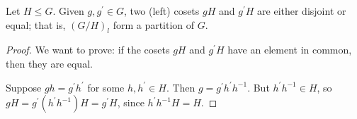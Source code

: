 \begin{comment}
\begin{mdframed}
The following is an alternative formation using quotient sets.

Let $H\le G$. Define $\sim$ on $G$ as follows: for all $x,y\in G$,
\[x\sim y\iff x^{-1}y\in H.\]
We verify that this is an equivalence relation:
\begin{enumerate}[label=(\roman*)]
\item $\forall x\in G$,
\[x^{-1}x=e\in H\implies x\sim x\]
\item $\forall x,y\in G$,
\begin{align*}
x\sim y
&\implies x^{-1}y\in H\\
&\implies (x^{-1}y)^{-1}\in H\\
&\implies y^{-1}x\in H\\
&\implies y\sim x
\end{align*}
\item $\forall a,b,c\in G$,
\begin{align*}
a\sim b,b\sim c
&\implies a^{-1}b\in H, b^{-1}c\in H\\
&\implies (a^{-1}b)(b^{-1}c)=a^{-1}c\in H\\
&\implies a\sim c
\end{align*}
\end{enumerate}
Denote the set of equivalence classes as
\[G/\sim\coloneqq\{[x]\mid x\in G\}.\]
Given $x,y\in G$, we formulate a left coset of $H$ in $G$ as follows:
\begin{align*}
x\sim y
&\iff x^{-1}y\in H\\
&\iff \exists h\in H,x^{-1}y=h\\
&\iff \exists h\in H,y=xh\iff y\in xH
\end{align*}
and hence $[x]=xH$. Thus we can write
\[G/\sim=(G/H)_{l}.\]
As for the right coset, define
\[x\sim y\iff xy^{-1}\in H\]
and the rest is similar.
\end{mdframed}
\end{comment}

\begin{proposition}
Let $H\le G$. Given $g,g^\prime\in G$, two (left) cosets $gH$ and $g^\prime H$ are either disjoint or equal; that is, $(G/H)_l$ form a partition of $G$.
\end{proposition}

\begin{proof}
We want to prove: if the cosets $gH$ and $g^\prime H$ have an element in common, then they are equal.

Suppose $gh=g^\prime h^\prime$ for some $h,h^\prime\in H$. Then $g=g^\prime h^\prime h^{-1}$. But $h^\prime h^{-1}\in H$, so $gH=g^\prime(h^\prime h^{-1})H=g^\prime H$, since $h^\prime h^{-1}H=H$.
\end{proof}

